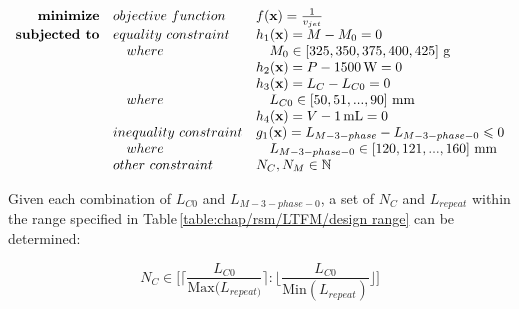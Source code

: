                 
                \begin{equation}
                    \begin{array}{rll}
                        \textbf{minimize}       & \small{objective\,\,function}     & f(\textbf{x})=\frac{1}{v_{jet}} \\
                        \textbf{subjected to}   & \small{equality\,\,constraint}    & h_1(\textbf{x})=M - M_0= 0\\
                                                &\quad \small{where}                &\quad  M_0\in\left[325,350,375,400,425\right]\,\mathrm{g}\\
                                                &                                   & h_2(\textbf{x})=P - 1500\,\mathrm{W}=0\\
                                                &                                   & h_3(\textbf{x})=L_{C} - L_{C0} = 0\\
                                                &\quad \small{where}                &\quad  L_{C0}\in\left[50,51,...,90\right]\,\mathrm{mm}\\
                                                &                                   & h_4(\textbf{x})=V - 1\,\mathrm{mL} = 0\\
                                                & \small{inequality\,\,constraint}  & g_1(\textbf{x})=L_{M-3-phase}-L_{M-3-phase-0} \leqslant 0\\
                                                &\quad \small{where}                &\quad L_{M-3-phase-0} \in \left[120,121,...,160\right]\,\mathrm{mm} \\
                                                & \small{other\,\,constraint}       & N_C, N_M \in 	\mathbb{N} \\
                    \end{array}
                    \label{eq:outer optimization for LTMFs}
                \end{equation}
                
                
                Given each combination of $L_{C0}$ and $L_{M-3-phase-0}$, a set of $N_C$ and $L_{repeat}$ within the range specified in Table\,\ref{table:chap/rsm/LTFM/design range} can be determined:
                
                
                \begin{equation}
                    N_C \in \Bigg[\bigg\lceil {\frac{L_{C0}}{\mathrm{Max}(L_{repeat)}}} \bigg\rceil:\bigg\lfloor{\frac{L_{C0}}{\mathrm{Min}(L_{repeat})}}\bigg\rfloor\Bigg] 
                    \label{eq:chap/rsm/LTFM/list of N_C}
                \end{equation}
            
